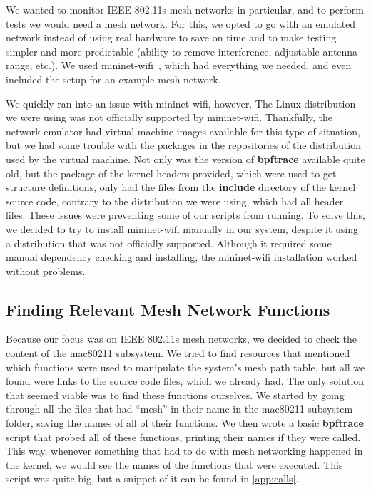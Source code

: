 We wanted to monitor \ac{IEEE} 802.11s mesh networks in particular, and to
perform tests we would need a mesh network. For this, we opted to go with an
emulated network instead of using real hardware to save on time and to make
testing simpler and more predictable (ability to remove interference, adjustable
antenna range, etc.). We used mininet-wifi~\cite{mnwifi}, which had everything
we needed, and even included the setup for an example mesh network.

We quickly ran into an issue with mininet-wifi, however. The Linux distribution
we were using was not officially supported by mininet-wifi. Thankfully, the
network emulator had virtual machine images available for this type of
situation, but we had some trouble with the packages in the repositories of the
distribution used by the virtual machine. Not only was the version of
\textbf{bpftrace} available quite old, but the package of the kernel headers
provided, which were used to get structure definitions, only had the files from
the \textbf{include} directory of the kernel source code, contrary to the
distribution we were using, which had all header files. These issues were
preventing some of our scripts from running. To solve this, we decided to try to
install mininet-wifi manually in our system, despite it using a distribution
that was not officially supported. Although it required some manual dependency
checking and installing, the mininet-wifi installation worked without problems.


\subsection{Finding Relevant Mesh Network Functions}\label{subs:mesh}

Because our focus was on \ac{IEEE} 802.11s mesh networks, we decided to check
the content of the mac80211 subsystem. We tried to find resources that mentioned
which functions were used to manipulate the system's mesh path table, but all we
found were links to the source code files, which we already had. The only
solution that seemed viable was to find these functions ourselves. We started by
going through all the files that had ``mesh'' in their name in the mac80211
subsystem folder, saving the names of all of their functions. We then wrote a
basic \textbf{bpftrace} script that probed all of these functions, printing
their names if they were called. This way, whenever something that had to do
with mesh networking happened in the kernel, we would see the names of the
functions that were executed. This script was quite big, but a snippet of it can
be found in \autoref{app:calls}.

